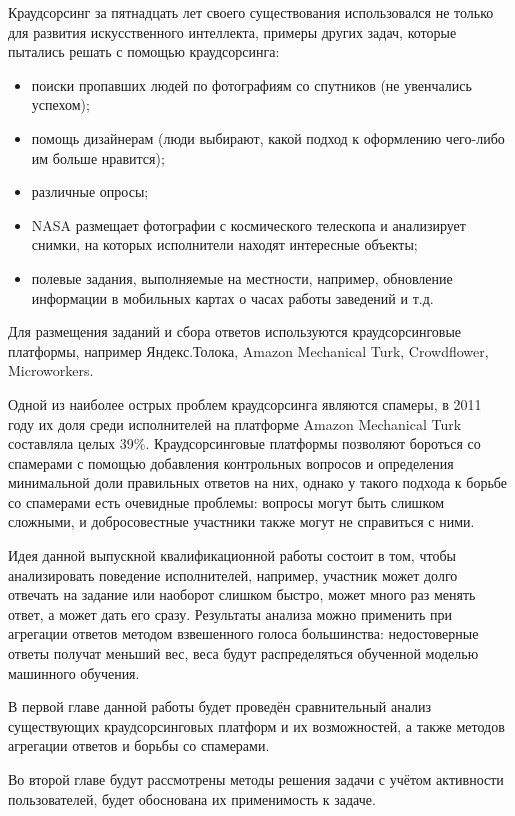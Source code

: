 \documentclass[specification,annotation,times]{itmo-student-thesis}
\begin{document}
Краудсорсинг за пятнадцать лет своего существования использовался не только для развития искусственного интеллекта, примеры других задач, которые пытались решать с помощью краудсорсинга:
\begin{itemize}
    \item поиски пропавших людей по фотографиям со спутников (не увенчались успехом);
    \item помощь дизайнерам (люди выбирают, какой подход к оформлению чего-либо им больше нравится);
    \item различные опросы;
    \item NASA размещает фотографии с космического телескопа и анализирует снимки, на которых исполнители находят интересные объекты;
    \item полевые задания, выполняемые на местности, например, обновление информации в мобильных картах о часах работы заведений и т.д.
\end{itemize}

Для размещения заданий и сбора ответов используются краудсорсинговые платформы, например Яндекс.Толока, Amazon Mechanical Turk, Crowdflower, Microworkers.

Одной из наиболее острых проблем краудсорсинга являются спамеры, в 2011 году их доля среди исполнителей на платформе Amazon Mechanical Turk составляла целых 39\%. Краудсорсинговые платформы позволяют бороться со спамерами с помощью добавления контрольных вопросов и определения минимальной доли правильных ответов на них, однако у такого подхода к борьбе со спамерами есть очевидные проблемы: вопросы могут быть слишком сложными, и добросовестные участники также могут не справиться с ними.

Идея данной выпускной квалификационной работы состоит в том, чтобы анализировать поведение исполнителей, например, участник может долго отвечать на задание или наоборот слишком быстро, может много раз менять ответ, а может дать его сразу. Результаты анализа можно применить при агрегации ответов методом взвешенного голоса большинства: недостоверные ответы получат меньший вес, веса будут распределяться обученной моделью машинного обучения.

В первой главе данной работы будет проведён сравнительный анализ существующих краудсорсинговых платформ и их возможностей, а также методов агрегации ответов и борьбы со спамерами.

Во второй главе будут рассмотрены методы решения задачи с учётом активности пользователей, будет обоснована их применимость к задаче.
\end{document}

